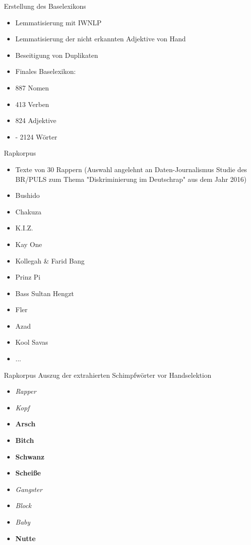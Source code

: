\documentclass{beamer}
\begin{document}
\begin{frame}{Erstellung des Baselexikons}
	\begin{itemize}

		\item Lemmatisierung mit IWNLP
		\item Lemmatisierung der nicht erkannten Adjektive von Hand
		\item Beseitigung von Duplikaten
		\item Finales Baselexikon:
		\item 887 Nomen
		\item 413 Verben
		\item 824 Adjektive
		\item  - 2124 Wörter

	\end{itemize}
\end{frame}

\begin{frame}{Rapkorpus}
\begin{itemize}
\item Texte von 30 Rappern (Auswahl angelehnt an Daten-Journalismus Studie des BR/PULS zum Thema "Diskriminierung im Deutschrap" aus dem Jahr 2016)
	\item Bushido
	\item Chakuza
	\item K.I.Z.
	\item Kay One
	\item Kollegah \& Farid Bang
	\item Prinz Pi
	\item Bass Sultan Hengzt
	\item Fler
	\item Azad
	\item Kool Savas
	\item ...

\end{itemize}
\end{frame}

\begin{frame}{Rapkorpus}
Auszug der extrahierten Schimpfwörter vor Handselektion
\begin{itemize}
		
\item \emph{Rapper}
\item \emph{Kopf}
\item \textbf{Arsch}
\item \textbf{Bitch}
\item \textbf{Schwanz}
\item \textbf{Scheiße}
\item \emph{Gangster}
\item \emph{Block}
\item \emph{Baby}
\item \textbf{Nutte}
		
\end{itemize}
\end{frame}
\end{document}
